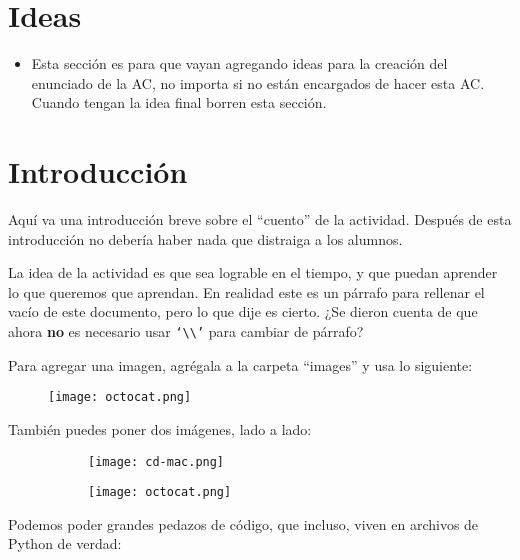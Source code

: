 \documentclass{iic2233activity}
\begin{document}
\section*{Ideas}
\begin{itemize}
	\item Esta sección es para que vayan agregando ideas para la creación del enunciado de la AC, no importa si no están encargados de hacer esta AC. Cuando tengan la idea final borren esta sección.
\end{itemize}

\section*{Introducción}

Aquí va una introducción breve sobre el  ``cuento'' de la actividad. Después de esta introducción no debería haber nada que distraiga a los alumnos.

La idea de la actividad es que sea lograble en el tiempo, y que puedan aprender lo que queremos que aprendan. En realidad este es un párrafo para rellenar el vacío de este documento, pero lo que dije es cierto. ¿Se dieron cuenta de que ahora \textbf{no} es necesario usar \texttt{`\textbackslash\textbackslash'} para cambiar de párrafo?

Para agregar una imagen, agrégala a la carpeta ``images'' y usa lo siguiente:

\begin{figure}[h!]
	\centering
	\texttt{[image: octocat.png]}
\end{figure}

\clearpage %

También puedes poner dos imágenes, lado a lado:

\begin{figure}[h!]
	\centering
	\begin{subfigure}{.49\linewidth}
		\centering
		\texttt{[image: cd-mac.png]}
	\end{subfigure}
	\begin{subfigure}{.49\linewidth}
		\centering
		\texttt{[image: octocat.png]}
	\end{subfigure}
\end{figure}

Podemos poder grandes pedazos de código, que incluso, viven en archivos de Python de verdad:

\end{document}
